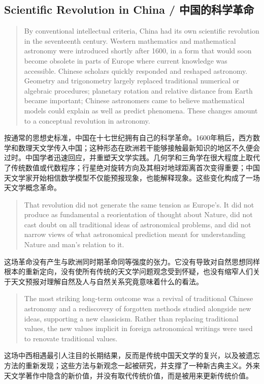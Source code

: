 \documentclass[UTF8,zihao=-4]{ctexart}
\newenvironment{enblock}
  {\par\smallskip\noindent{\scriptsize\bfseries English}\par\begin{quote}\small}
  {\end{quote}}
\newenvironment{zhblock}
  {\par\noindent{\scriptsize\bfseries 中文}\par}
  {\par\medskip}
\begin{document}
\subsection*{Scientific Revolution in China / 中国的科学革命}

\begin{enblock}
By conventional intellectual criteria, China had its own scientific revolution in the seventeenth century. Western mathematics and mathematical astronomy were introduced shortly after 1600, in a form that would soon become obsolete in parts of Europe where current knowledge was accessible. Chinese scholars quickly responded and reshaped astronomy. Geometry and trigonometry largely replaced traditional numerical or algebraic procedures; planetary rotation and relative distance from Earth became important; Chinese astronomers came to believe mathematical models could explain as well as predict phenomena. These changes amount to a conceptual revolution in astronomy.
\end{enblock}
\begin{zhblock}
按通常的思想史标准，中国在十七世纪拥有自己的科学革命。1600年稍后，西方数学和数理天文学传入中国；这种形态在欧洲若干能够接触最新知识的地区不久便会过时。中国学者迅速回应，并重塑天文学实践。几何学和三角学在很大程度上取代了传统数值或代数程序；行星绝对旋转方向及其相对地球距离首次变得重要；中国天文学家开始相信数学模型不仅能预报现象，也能解释现象。这些变化构成了一场天文学概念革命。
\end{zhblock}

\begin{enblock}
That revolution did not generate the same tension as Europe's. It did not produce as fundamental a reorientation of thought about Nature, did not cast doubt on all traditional ideas of astronomical problems, and did not narrow views of what astronomical prediction meant for understanding Nature and man's relation to it.
\end{enblock}
\begin{zhblock}
这场革命没有产生与欧洲同时期革命同等强度的张力。它没有导致对自然思想同样根本的重新定向，没有使所有传统的天文学问题观念受到怀疑，也没有缩窄人们关于天文预报对理解自然及人与自然关系究竟意味着什么的看法。
\end{zhblock}

\begin{enblock}
The most striking long-term outcome was a revival of traditional Chinese astronomy and a rediscovery of forgotten methods studied alongside new ideas, supporting a new classicism. Rather than replacing traditional values, the new values implicit in foreign astronomical writings were used to renovate traditional values.
\end{enblock}
\begin{zhblock}
这场中西相遇最引人注目的长期结果，反而是传统中国天文学的复兴，以及被遗忘方法的重新发现；这些方法与新观念一起被研究，并支撑了一种新古典主义。外来天文学著作中隐含的新价值，并没有取代传统价值，而是被用来更新传统价值。
\end{zhblock}
\end{document}
